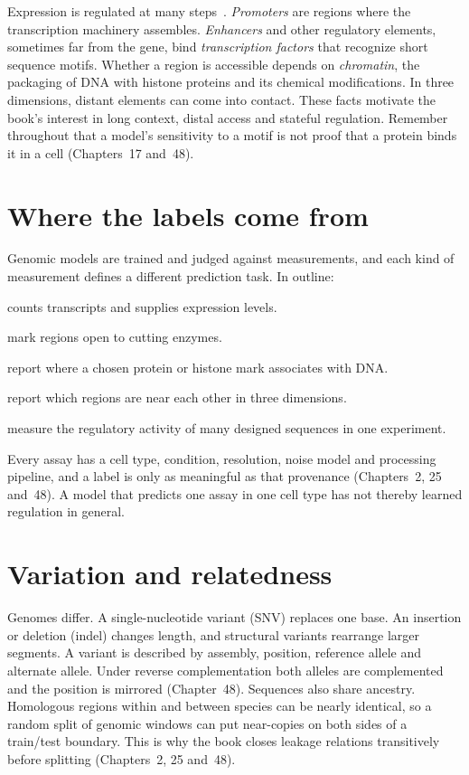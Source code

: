 Expression is regulated at many steps~\cite{albertscontrol}. \emph{Promoters} are
regions where the transcription machinery assembles. \emph{Enhancers} and other
regulatory elements, sometimes far from the gene, bind \emph{transcription factors}
that recognize short sequence motifs. Whether a region is accessible depends on
\emph{chromatin}, the packaging of DNA with histone proteins and its chemical
modifications. In three dimensions, distant elements can come into contact. These
facts motivate the book's interest in long context, distal access and stateful
regulation. Remember throughout that a model's sensitivity to a motif is not proof that
a protein binds it in a cell (Chapters~17 and~48).

\section{Where the labels come from}
Genomic models are trained and judged against measurements, and each kind of
measurement defines a different prediction task. In outline:
\begin{description}
\setlength{\itemsep}{1pt}
\item[RNA sequencing] counts transcripts and supplies expression levels.
\item[Chromatin accessibility assays] mark regions open to cutting enzymes.
\item[Immunoprecipitation-based assays] report where a chosen protein or histone mark
associates with DNA.
\item[Chromosome conformation assays] report which regions are near each other in
three dimensions.
\item[Massively parallel reporter assays] measure the regulatory activity of many
designed sequences in one experiment.
\end{description}
Every assay has a cell type, condition, resolution, noise model and processing pipeline,
and a label is only as meaningful as that provenance (Chapters~2, 25 and~48). A
model that predicts one assay in one cell type has not thereby learned regulation in
general.

\section{Variation and relatedness}
Genomes differ. A single-nucleotide variant (SNV) replaces one base. An insertion or
deletion (indel) changes length, and structural variants rearrange larger segments.
A variant is described by assembly, position, reference allele and alternate allele.
Under reverse complementation both alleles are complemented and the position is
mirrored (Chapter~48). Sequences also share ancestry. Homologous regions within and
between species can be nearly identical, so a random split of genomic windows can put
near-copies on both sides of a train/test boundary. This is why the book closes
leakage relations transitively before splitting (Chapters~2, 25 and~48).

